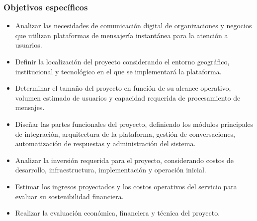 \subsubsection{Objetivos específicos}
\begin{itemize}
    \item Analizar las necesidades de comunicación digital de organizaciones y negocios que utilizan plataformas de mensajería instantánea para la atención a usuarios.

    \item Definir la localización del proyecto considerando el entorno geográfico, institucional y tecnológico en el que se implementará la plataforma.

    \item Determinar el tamaño del proyecto en función de su alcance operativo, volumen estimado de usuarios y capacidad requerida de procesamiento de mensajes.

    \item Diseñar las partes funcionales del proyecto, definiendo los módulos principales de integración, arquitectura de la plataforma, gestión de conversaciones, automatización de respuestas y administración del sistema.

    \item Analizar la inversión requerida para el proyecto, considerando costos de desarrollo, infraestructura, implementación y operación inicial.

    \item Estimar los ingresos proyectados y los costos operativos del servicio para evaluar su sostenibilidad financiera.

    \item Realizar la evaluación económica, financiera y técnica del proyecto.
\end{itemize}

